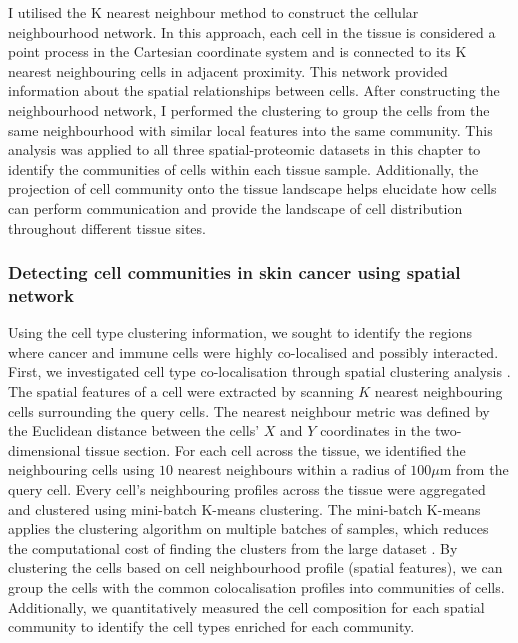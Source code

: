 I utilised the K nearest neighbour method to construct the cellular neighbourhood network. In this approach, each cell in the tissue is considered a point process in the Cartesian coordinate system and is connected to its K nearest neighbouring cells in adjacent proximity. This network provided information about the spatial relationships between cells. After constructing the neighbourhood network, I performed the clustering to group the cells from the same neighbourhood with similar local features into the same community. This analysis was applied to all three spatial-proteomic datasets in this chapter to identify the communities of cells within each tissue sample. Additionally, the projection of cell community onto the tissue landscape helps elucidate how cells can perform communication and provide the landscape of cell distribution throughout different tissue sites. 

\subsubsection{Detecting cell communities in skin cancer using spatial network}
\label{Sec:3_cell_communities_and_coocurrence}	%
Using the cell type clustering information, we sought to identify the regions where cancer and immune cells were highly co-localised and possibly interacted. First, we investigated cell type co-localisation through spatial clustering analysis \cite{schurch2020coordinated}. The spatial features of a cell were extracted by scanning $K$ nearest neighbouring cells surrounding the query cells. The nearest neighbour metric was defined by the Euclidean distance between the cells' $X$ and $Y$ coordinates in the two-dimensional tissue section. For each cell across the tissue, we identified the neighbouring cells using $10$ nearest neighbours within a radius of $100\mu$m from the query cell. Every cell's neighbouring profiles across the tissue were aggregated and clustered using mini-batch K-means clustering. The mini-batch K-means applies the clustering algorithm on multiple batches of samples, which reduces the computational cost of finding the clusters from the large dataset \cite{sculley2010web}. By clustering the cells based on cell neighbourhood profile (\ie spatial features), we can group the cells with the common colocalisation profiles into communities of cells. Additionally, we quantitatively measured the cell composition for each spatial community to identify the cell types enriched for each community. 


